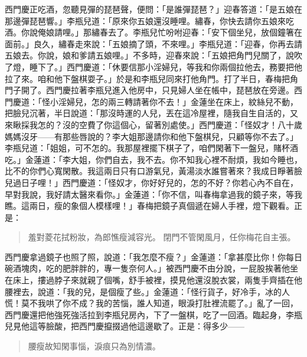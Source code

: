 西門慶正吃酒，忽聽見彈的琵琶聲，便問：「是誰彈琵琶？」迎春答道：「是五娘在那邊彈琵琶響。」李瓶兒道：「原來你五娘還沒睡哩。繡春，你快去請你五娘來吃酒。你說俺娘請哩。」那繡春去了。李瓶兒忙吩咐迎春：「安下個坐兒，放個鐘箸在面前。」良久，繡春走來說：「五娘摘了頭，不來哩。」李瓶兒道：「迎春，你再去請五娘去。你說，娘和爹請五娘哩。」不多時，迎春來說：「五娘把角門兒關了，說吹了燈，睡下了。」西門慶道：「休要信那小淫婦兒，等我和你兩個拉他去，務要把他拉了來。咱和他下盤棋耍子。」於是和李瓶兒同來打他角門。打了半日，春梅把角門子開了。西門慶拉著李瓶兒進入他房中，只見婦人坐在帳中，琵琶放在旁邊。西門慶道：「怪小淫婦兒，怎的兩三轉請著你不去！」金蓮坐在床上，紋絲兒不動，把臉兒沉著，半日說道：「那沒時運的人兒，丟在這冷屋裡，隨我自生自活的，又來瞅採我怎的？沒的空費了你這個心，留著別處使。」西門慶道：「怪奴才！八十歲媽媽沒牙——有那些唇說的？李大姐那邊請你和他下盤棋兒，只顧等你不去了。」李瓶兒道：「姐姐，可不怎的。我那屋裡擺下棋子了，咱們閑著下一盤兒，賭杯酒吃。」金蓮道：「李大姐，你們自去，我不去。你不知我心裡不耐煩，我如今睡也，比不的你們心寬閑散。我這兩日只有口游氣兒，黃湯淡水誰嘗著來？我成日睜著臉兒過日子哩！」西門慶道：「怪奴才，你好好兒的，怎的不好？你若心內不自在，早對我說，我好請太醫來看你。」金蓮道：「你不信，叫春梅拿過我的鏡子來，等我瞧。這兩日，瘦的象個人模樣哩！」春梅把鏡子真個遞在婦人手裡，燈下觀看。正是：
\begin{quote}
羞對菱花拭粉妝，為郎憔瘦減容光。
閉門不管閑風月，任你梅花自主張。
\end{quote}

西門慶拿過鏡子也照了照，說道：「我怎麼不瘦？」金蓮道：「拿甚麼比你！你每日碗酒塊肉，吃的肥胖胖的，專一隻奈何人。」被西門慶不由分說，一屁股挨著他坐在床上，摟過脖子來就親了個嘴，舒手被裡，摸見他還沒脫衣裳，兩隻手齊插在他腰裡去，說道：「我的兒，是個瘦了些。」金蓮道：「怪行貨子，好冷手，冰的人慌！莫不我哄了你不成？我的苦惱，誰人知道，眼淚打肚裡流罷了。」亂了一回，西門慶還把他強死強活拉到李瓶兒房內，下了一盤棋，吃了一回酒。臨起身，李瓶兒見他這等臉酸，把西門慶攛掇過他這邊歇了。正是：得多少——
\begin{quote}
腰瘦故知閑事惱，淚痕只為別情濃。
\end{quote}
